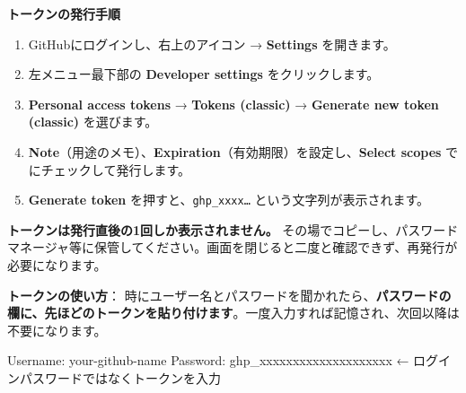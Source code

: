 \noindent\textbf{トークンの発行手順}

\begin{enumerate}[leftmargin=1.6em]
  \item GitHubにログインし、右上のアイコン → \textbf{Settings} を開きます。
  \item 左メニュー最下部の \textbf{Developer settings} をクリックします。
  \item \textbf{Personal access tokens} → \textbf{Tokens (classic)} → \textbf{Generate new token (classic)} を選びます。
  \item \textbf{Note}（用途のメモ）、\textbf{Expiration}（有効期限）を設定し、\textbf{Select scopes} で  にチェックして発行します。
  \item \textbf{Generate token} を押すと、\verb|ghp_xxxx…| という文字列が表示されます。
\end{enumerate}


\begin{warnbox}
\textbf{トークンは発行直後の1回しか表示されません。} その場でコピーし、パスワードマネージャ等に保管してください。画面を閉じると二度と確認できず、再発行が必要になります。
\end{warnbox}

\noindent\textbf{トークンの使い方}： 時にユーザー名とパスワードを聞かれたら、\textbf{パスワードの欄に、先ほどのトークンを貼り付けます}。一度入力すれば記憶され、次回以降は不要になります。

\begin{codebox}[text]
\begin{code}
Username: your-github-name
Password: ghp_xxxxxxxxxxxxxxxxxxxx   ← ログインパスワードではなくトークンを入力
\end{code}
\end{codebox}
